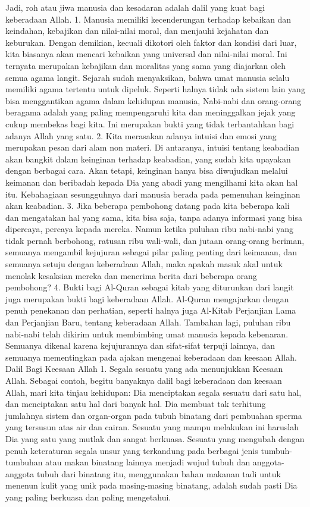 \documentclass[]{article}
\begin{document}
Jadi, roh atau jiwa manusia dan kesadaran adalah dalil yang kuat bagi keberadaan Allah. 
1. Manusia memiliki kecenderungan terhadap kebaikan dan keindahan, kebajikan dan nilai-nilai moral, dan menjauhi kejahatan dan keburukan. Dengan demikian,  kecuali dikotori oleh faktor dan kondisi dari luar, kita biasanya akan mencari kebaikan yang universal dan nilai-nilai moral. Ini ternyata merupakan kebajikan dan moralitas yang sama yang diajarkan oleh semua agama langit. Sejarah sudah menyaksikan, bahwa umat manusia selalu memiliki agama tertentu untuk dipeluk. Seperti halnya tidak ada sistem lain yang bisa menggantikan agama dalam kehidupan manusia, Nabi-nabi dan orang-orang beragama adalah yang paling mempengaruhi kita dan meninggalkan jejak yang cukup membekas bagi kita. Ini merupakan bukti yang tidak terbantahkan bagi adanya Allah yang satu.
2. Kita merasakan adanya intuisi dan emosi yang merupakan pesan dari alam non materi. Di antaranya, intuisi tentang keabadian akan bangkit dalam keinginan terhadap keabadian, yang  sudah kita upayakan dengan berbagai cara. Akan tetapi, keinginan hanya bisa diwujudkan melalui keimanan dan beribadah kepada Dia yang abadi yang mengilhami kita akan hal itu. Kebahagiaan sesungguhnya dari manusia berada pada pemenuhan keinginan akan keabadian.
3.  Jika beberapa pembohong datang pada kita beberapa kali dan mengatakan hal yang sama, kita bisa saja, tanpa adanya informasi yang bisa dipercaya, percaya kepada mereka. Namun ketika puluhan ribu nabi-nabi yang tidak pernah berbohong, ratusan ribu wali-wali, dan jutaan orang-orang beriman, semuanya mengambil kejujuran sebagai pilar paling penting dari keimanan, dan semuanya setuju dengan keberadaan Allah, maka apakah masuk akal untuk menolak kesaksian mereka dan menerima berita dari beberapa orang pembohong?
4. Bukti bagi Al-Quran sebagai kitab yang diturunkan dari langit juga merupakan bukti bagi keberadaan Allah. Al-Quran mengajarkan dengan penuh penekanan dan perhatian, seperti halnya juga Al-Kitab Perjanjian Lama dan Perjanjian Baru, tentang keberadaan Allah. Tambahan lagi, puluhan ribu nabi-nabi telah dikirim untuk membimbing umat manusia kepada kebenaran. Semuanya dikenal karena kejujurannya dan sifat-sifat terpuji lainnya, dan semuanya mementingkan pada ajakan mengenai keberadaan dan keesaan Allah.
Dalil  Bagi Keesaan Allah
1. Segala sesuatu yang ada  menunjukkan Keesaan Allah. Sebagai contoh, begitu banyaknya dalil bagi keberadaan dan keesaan Allah, mari kita tinjau kehidupan: Dia menciptakan segala sesuatu dari satu hal, dan menciptakan satu hal dari banyak hal. Dia membuat tak terhitung jumlahnya sistem dan organ-organ pada tubuh binatang dari pembuahan sperma yang tersusun atas air dan cairan. Sesuatu yang mampu melakukan ini haruslah Dia yang  satu yang mutlak dan sangat berkuasa.  Sesuatu yang mengubah dengan penuh keteraturan segala unsur yang terkandung pada berbagai  jenis tumbuh-tumbuhan  atau makan binatang lainnya menjadi wujud tubuh dan anggota-anggota tubuh dari binatang itu, menggunakan bahan makanan tadi untuk menenun kulit  yang unik pada masing-masing binatang, adalah sudah pasti Dia yang paling berkuasa dan paling mengetahui.
\end{document}
